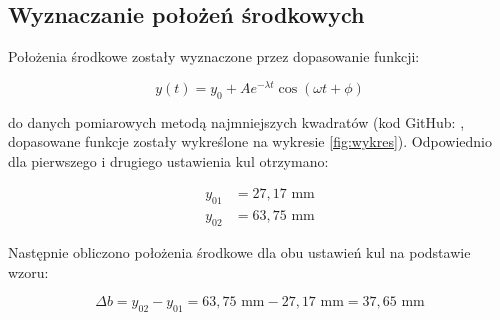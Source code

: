 \documentclass[a4paper,12pt]{article}
\begin{document}
\renewcommand{\arraystretch}{1}

\subsection{Wyznaczanie położeń środkowych}

Położenia środkowe zostały wyznaczone przez dopasowanie funkcji:

$$
    y(t) = y_0 + A e^{-\lambda t} \cos(\omega t + \phi)
$$

do danych pomiarowych metodą najmniejszych kwadratów (kod GitHub: \cite{damped-oscillation-regression}, dopasowane funkcje zostały wykreślone na wykresie \ref{fig:wykres}). Odpowiednio dla pierwszego i drugiego ustawienia kul otrzymano:

\begin{align*}
    y_{01} & = 27{,}17\text{ mm} \\
    y_{02} & = 63{,}75\text{ mm}
\end{align*}

Następnie obliczono położenia środkowe dla obu ustawień kul na podstawie wzoru:

$$
    \Delta b = y_{02} - y_{01} = 63{,}75\text{ mm} - 27{,}17\text{ mm} = 37{,}65\text{ mm}
$$






\end{document}
